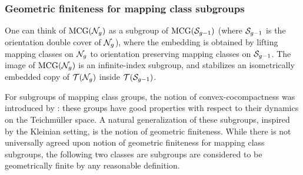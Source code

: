 



\subsubsection*{Geometric finiteness for mapping class subgroups}

One can think of $\mathrm{MCG}(\mathcal{N}_g)$ as a subgroup of $\mathrm{MCG}(\mathcal{S}_{g-1})$ (where $\mathcal{S}_{g-1}$ is the orientation double cover of $\mathcal{N}_g$), where the embedding is obtained by lifting mapping classes on $\mathcal{N}_g$ to orientation preserving mapping classes on $\mathcal{S}_{g-1}$.
The image of $\mathrm{MCG}(\mathcal{N}_g)$ is an infinite-index subgroup, and stabilizes an isometrically embedded copy of $\mathcal{T}(\mathcal{N}_g)$ inside $\mathcal{T}(\mathcal{S}_{g-1})$.

For subgroups of mapping class groups, the notion of convex-cocompactness was introduced by \textcite{farb2002convex}: these groups have good properties with respect to their dynamics on the Teichmüller space.
A natural generalization of these subgroups, inspired by the Kleinian setting, is the notion of geometric finiteness.
While there is not universally agreed upon notion of geometric finiteness for mapping class subgroups, the following two classes are subgroups are considered to be geometrically finite by any reasonable definition.

